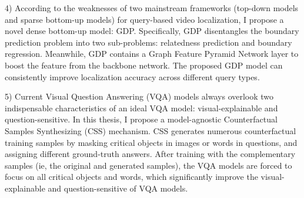 \begin{englishabstract}
4) According to the weaknesses of two mainstream frameworks (top-down models and sparse bottom-up models) for query-based video localization, I propose a novel dense bottom-up model: GDP. Specifically, GDP disentangles the boundary prediction problem into two sub-problems: relatedness prediction and boundary regression. Meanwhile, GDP contains a Graph Feature Pyramid Network layer to boost the feature from the backbone network. The proposed GDP model can consistently improve localization accuracy across different query types.

5) Current Visual Question Answering (VQA) models always overlook two indispensable characteristics of an ideal VQA model: visual-explainable and question-sensitive. In this thesis, I propose a model-agnostic Counterfactual Samples Synthesizing (CSS) mechanism. CSS generates numerous counterfactual training samples by masking critical objects in images or words in questions, and assigning different ground-truth answers. After training with the complementary samples (ie, the original and generated samples), the VQA models are forced to focus on all critical objects and words, which significantly improve the visual-explainable and question-sensitive of VQA models.


\end{englishabstract}
